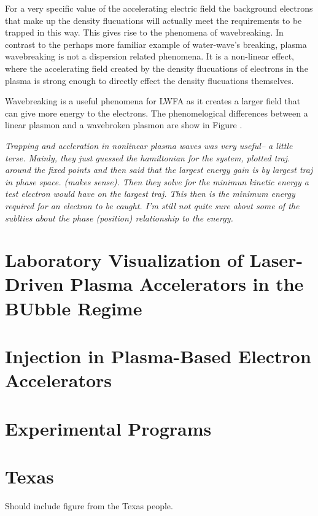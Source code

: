 \documentclass[12pt, titlepage]{caesar_book}
\begin{document}

For a very specific value of the accelerating electric field the background electrons that make up the density flucuations will actually meet the requirements to be trapped in this way. This gives rise to the phenomena of wavebreaking. In contrast to the perhaps more familiar example of water-wave's breaking, plasma wavebreaking is not a dispersion related phenomena. It is a non-linear effect, where the accelerating field created by the density flucuations of electrons in the plasma is strong enough to directly effect the density flucuations themselves.

Wavebreaking is a useful phenomena for LWFA as it creates a larger field that can give more energy to the electrons. The phenomelogical differences between a linear plasmon and a wavebroken plasmon are show in Figure .

{\em Trapping and accleration in nonlinear plasma waves was very useful-- a little terse. Mainly, they just guessed the hamiltonian for the system, plotted traj. around the fixed points and then said that the largest energy gain is by largest traj in phase space. (makes sense). Then they solve for the minimun kinetic energy a test electron would have on the largest traj. This then is the minimum energy required for an electron to be caught. I'm still not quite sure about some of the sublties about the phase (position) relationship to the energy.}

\section{Laboratory Visualization of Laser-Driven Plasma Accelerators in the BUbble Regime}
\section{Injection in Plasma-Based Electron Accelerators}
\section{Experimental Programs}
\section{Texas}
Should include figure from the Texas people. 
\end{document}
